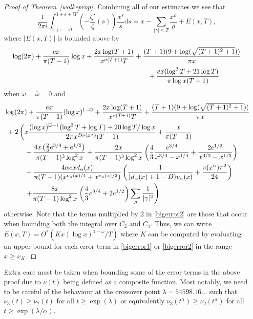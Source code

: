 \documentclass[reqno]{amsart}
\numberwithin{equation}{section}
\theoremstyle{remark}
\begin{document}
\begin{proof}[Proof of Theorem~\ref{wolkeprop}]
Combining all of our estimates we see that
\begin{equation*}
    \frac{1}{2\pi i}\int_{1+\varepsilon-iT}^{1+\varepsilon+iT}\left(-\frac{\zeta'}{\zeta}(s) \right) \frac{x^s}{s}\mathrm{d}s =x-\sum_{|\gamma|\leq T}\frac{x^\rho}{\rho}+E(x,T),
\end{equation*}
where $|E(x,T)|$ is bounded above by
\begin{align}\label{bigerror1}
    \log(2\pi)+\frac{ex}{\pi(T-1)}\log x+\frac{2x\log (T+1)}{x^{\nu(T+1)}T}&+\frac{(T+1)(9+\log(\sqrt{(T+1)^2+1}))}{\pi x}\notag\\
    &\qquad +\frac{ex(\log^2T+21\log T)}{\pi\log x(T-1)}
\end{align}
when $\omega=\overline{\omega}=0$ and
\begin{align}\label{bigerror2}
    &\log(2\pi)+\frac{ex}{\pi(T-1)}(\log x)^{1-\overline{\omega}}+\frac{2x\log (T+1)}{x^{\nu(T+1)}T}+\frac{(T+1)(9+\log(\sqrt{(T+1)^2+1}))}{\pi x}\notag\\
    &\ +2\left(x\frac{(\log x)^{\overline{\omega}-1}(\log^2T+\log T)+20\log T/\log x}{2\pi x^{D \nu(x^{\alpha})}(T-1)}+\frac{x}{\pi(T-1)}\right.\notag\\
    &\qquad\quad +\frac{4x\left(\frac{2}{3}e^{3/4}+e^{1/2}\right)}{\pi(T-1)^3\log^2x}+\frac{2x}{\pi (T-1)^3\log ^2x}\left(\frac{4}{3}\frac{e^{3/4}}{x^{3/4}-x^{1/4}}+\frac{2e^{1/2}}{x^{3/2}-x^{1/2}}\right)\notag\\
    &\qquad\quad +\frac{4\alpha exd_{\alpha}(x)}{\pi(T-1)(x^{\nu_{\alpha}(x)/4}+x^{\nu_{\alpha}(x)/2})}\left(\frac{1}{(d_{\alpha}(x)+1-D)v_{\alpha}(x)}+\frac{v(x^\alpha)\pi^2}{24}\right)\notag\\
    &\left.\qquad\quad+\frac{8x}{\pi(T-1)\log^2 x}\left(\frac{4}{3}e^{3/4}+2e^{1/2}\right)\sum_{\rho}\frac{1}{|\gamma|^2}\right)
\end{align}
otherwise. Note that the terms multiplied by 2 in \eqref{bigerror2} are those that occur when bounding both the integral over $C_2$ and $C_4$. Thus, we can write $E(x,T)=O^*(Kx(\log x)^{1-\omega}/T)$ where $K$ can be computed by evaluating an upper bound for each error term in \eqref{bigerror1} or \eqref{bigerror2} in the range $x\geq x_K$.
\end{proof}

Extra care must be taken when bounding some of the error terms in the above proof due to $\nu(t)$ being defined as a composite function. Most notably, we need to be careful of the behaviour at the crossover point $\lambda=54598.16\ldots$ such that $\nu_3(t)\geq\nu_2(t)$ for all $t\geq\exp(\lambda)$ or equivalently $\nu_3(t^\alpha)\geq\nu_2(t^\alpha)$ for all $t\geq \exp(\lambda/\alpha)$.
\end{document}
